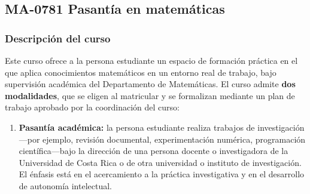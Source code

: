 \newpage
\subsection*{MA-0781 Pasantía en matemáticas}

\hypertarget{MA0781}{}
\begin{refsection}
\begin{table}[H]
\end{table}

\subsubsection*{Descripción del curso}

Este curso ofrece a la persona estudiante un espacio de formación práctica en el que aplica conocimientos matemáticos en un entorno real de trabajo, bajo supervisión académica del Departamento de Matemáticas. El curso admite \textbf{dos modalidades}, que se eligen al matricular y se formalizan mediante un plan de trabajo aprobado por la coordinación del curso:

\begin{enumerate}
\item \textbf{Pasantía académica:} la persona estudiante realiza trabajos de investigación ---por ejemplo, revisión documental, experimentación numérica, programación científica---bajo la dirección de una persona docente o investigadora de la Universidad de Costa Rica o de otra universidad o instituto de investigación. El énfasis está en el acercamiento a la práctica investigativa y en el desarrollo de autonomía intelectual.


\end{enumerate}
\end{refsection}
